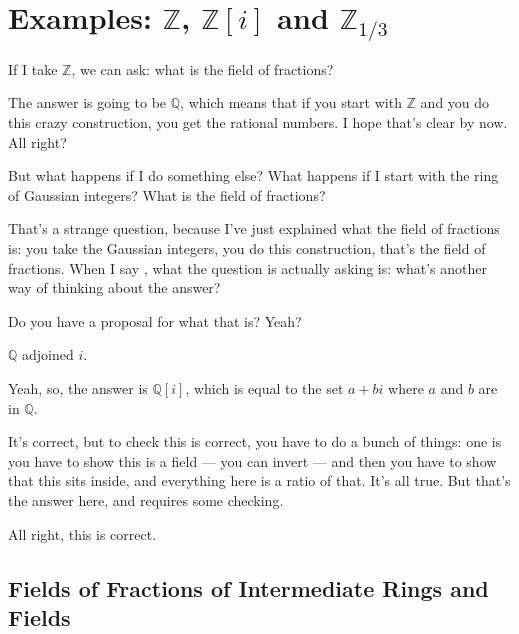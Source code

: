 \section{Examples: \texorpdfstring{$\mathbb{Z}$, $\mathbb{Z}[i]$ and $\mathbb{Z}_{1/3}$}{Z, Z[i] and Z\_1/3}}

\begin{speech}[01:09:44 - 01:10:46]
If I take $\mathbb{Z}$,  we can ask: what is the field of fractions?

The answer is going to be $\mathbb{Q}$,  which means that if you start with $\mathbb{Z}$ and you do this crazy construction, you get the rational numbers. I hope that's clear by now. All right?

But what happens if I do something else? What happens if I start with the ring of Gaussian integers? What is the field of fractions? 

That's a strange question, because I've just explained what the field of fractions is: you take the Gaussian integers, you do this construction, that's the field of fractions. When I say , what the question is actually asking is: what's another way of thinking about the answer?

Do you have a proposal for what that is? Yeah?
\end{speech}

\begin{student}
$\mathbb{Q}$ adjoined $i$.
\end{student}

\begin{speech}[01:10:46 - 01:11:22]
Yeah, so, the answer is $\mathbb{Q}[i]$,  which is equal to the set $a + bi$ where $a$ and $b$ are in $\mathbb{Q}$.

It's correct, but to check this is correct, you have to do a bunch of things: one is you have to show this is a field --- you can invert --- and then you have to show that this sits inside, and everything here is a ratio of that. It's all true. But that's the answer here, and requires some checking.

All right, this is correct.
\end{speech}

\subsection{Fields of Fractions of Intermediate Rings and Fields}

